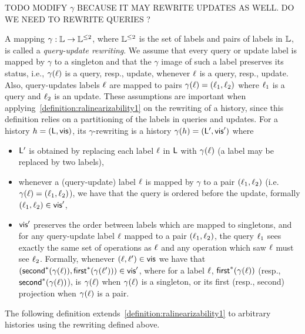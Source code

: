TODO MODIFY $\gamma$ BECAUSE IT MAY REWRITE UPDATES AS WELL. DO WE NEED TO REWRITE QUERIES ?

A mapping $\gamma:\mathbb{L}\rightarrow \mathbb{L}^{\leq 2}$, where $\mathbb{L}^{\leq 2}$ is the set of labels and pairs of labels in $\mathbb{L}$, is called a \emph{query-update rewriting}.
We assume that every query or update label is mapped by $\gamma$ to a singleton and that the $\gamma$ image of such a label preserves its status, i.e., $\gamma(\ell)$ is a query, resp., update, whenever $\ell$ is a query, resp., update. Also, query-updates labels $\ell$ are mapped to pairs $\gamma(\ell)=(\ell_1,\ell_2)$ where $\ell_1$ is a query and $\ell_2$ is an update. These assumptions are important when applying~\autoref{definition:ralinearizability1} on the rewriting of a history, since this definition relies on a partitioning of the labels in queries and updates.
For a history $h=(\mathsf{L},\mathsf{vis})$, its $\gamma$-rewriting is a
history $\gamma(h)=(\mathsf{L}',\mathsf{vis}')$ where
\begin{itemize}
\item $\mathsf{L}'$ is obtained by replacing each label $\ell$ in
  $\mathsf{L}$ with $\gamma(\ell)$ (a label may be replaced by two
  labels),
\item whenever a (query-update) label $\ell$ is mapped by $\gamma$
  to a pair $(\ell_1,\ell_2)$ (i.e.
  $\gamma(\ell)=(\ell_1,\ell_2)$), we have that the query is
  ordered before the update, formally $(\ell_1,\ell_2)\in \mathsf{vis}'$,
\item $\mathsf{vis}'$ preserves the order between labels which are
  mapped to singletons, and
  for any query-update label $\ell$ mapped to a pair
 $(\ell_1,\ell_2)$, the query $\ell_1$ sees exactly the same
 set of operations as $\ell$ and any operation which saw $\ell$
 must see $\ell_2$.
 Formally, whenever $(\ell,\ell')\in\mathsf{vis}$ we have that
 $(\mathsf{second}^*(\gamma(\ell)),
 \mathsf{first}^*(\gamma(\ell')))\in\mathsf{vis}'$, where for a label $\ell$,
 $\mathsf{first}^*(\gamma(\ell))$ (resp., $\mathsf{second}^*(\gamma(\ell))$), is
 $\gamma(\ell)$ when $\gamma(\ell)$ is a singleton, or its first (resp.,
 second) projection when $\gamma(\ell)$ is a pair.
\end{itemize}
The following definition
extends~\autoref{definition:ralinearizability1} to arbitrary histories
using the rewriting defined above.

